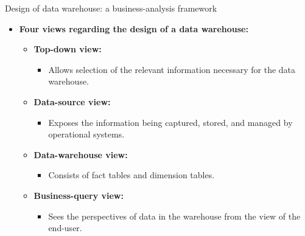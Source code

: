 \documentclass[aspectratio=169,t]{beamer}
\begin{document}
  { 
    \begin{frame}{Design of data warehouse: a business-analysis framework}
        \begin{itemize}
            \item \textbf{Four views regarding the design of a data warehouse:}
            \begin{itemize}
              \item \textbf{\color{airforceblue}Top-down view:}
              \begin{itemize}
                \item Allows selection of the relevant information necessary for the data warehouse.
              \end{itemize}
              \item \textbf{\color{airforceblue}Data-source view:}
              \begin{itemize}
                \item Exposes the information being captured, stored, and managed by operational systems.
              \end{itemize}
              \item \textbf{\color{airforceblue}Data-warehouse view:}
              \begin{itemize}
                \item Consists of fact tables and dimension tables.
              \end{itemize}
              \item \textbf{\color{airforceblue}Business-query view:}
              \begin{itemize}
                \item Sees the perspectives of data in the warehouse from the view of the end-user.
              \end{itemize}
            \end{itemize}
        \end{itemize}
    \end{frame}
  }
\end{document}
